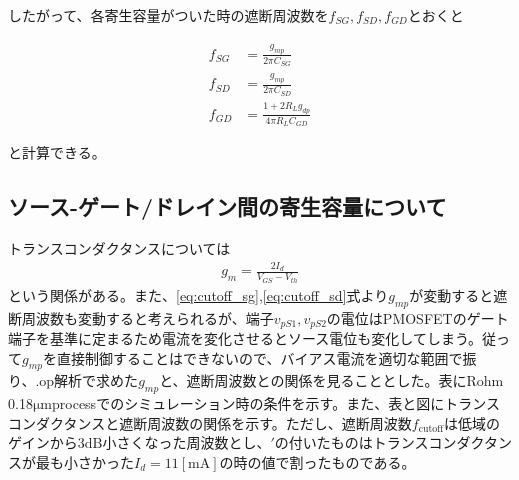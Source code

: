 \documentclass[twocolumn]{jsarticle}
\begin{document}
したがって、各寄生容量がついた時の遮断周波数を$f_{SG},f_{SD},f_{GD}$とおくと

\begin{align}
    f_{SG} &= \frac{g_{mp}}{2\pi C_{SG}}    \label{eq:cutoff_sg}\\
    f_{SD} &= \frac{g_{mp}}{2\pi C_{SD}}    \label{eq:cutoff_sd}\\
    f_{GD} &= \frac{1+2R_{L}g_{dp}}{4\pi R_{L}C_{GD}}      \label{eq:cutoff_gd}
\end{align}

と計算できる。

\subsection{ソース-ゲート/ドレイン間の寄生容量について}
    トランスコンダクタンスについては
    \begin{align*}
        g_{m}=\frac{2I_{d}}{V_{GS}-V_{th}}
    \end{align*}
    という関係がある。また、\eqref{eq:cutoff_sg},\eqref{eq:cutoff_sd}式より$g_{mp}$が変動すると遮断周波数も変動すると考えられるが、端子$v_{pS1},v_{pS2}$の電位はPMOSFETのゲート端子を基準に定まるため電流を変化させるとソース電位も変化してしまう。従って$g_{mp}$を直接制御することはできないので、バイアス電流を適切な範囲で振り、.op解析で求めた$g_{mp}$と、遮断周波数との関係を見ることとした。表\nobreak{}にRohm 0.18$\mathrm{\mu m}$processでのシミュレーション時の条件を示す。また、表と図にトランスコンダクタンスと遮断周波数の関係を示す。ただし、遮断周波数$f_{\mathrm{cutoff}}$は低域のゲインから$3\mathrm{dB}$小さくなった周波数とし、$\prime$の付いたものはトランスコンダクタンスが最も小さかった$I_{d}=11\mathrm{[mA]}$の時の値で割ったものである。
\end{document}
